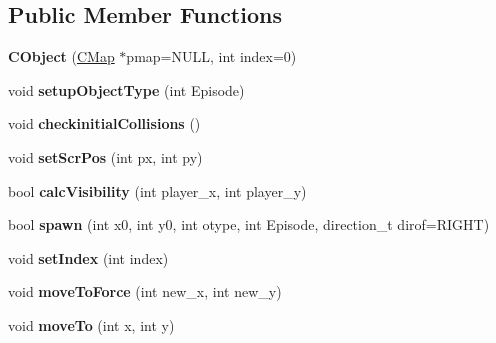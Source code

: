 \subsection*{Public Member Functions}
\begin{DoxyCompactItemize}
\item 
\hypertarget{class_c_object_a15f0090059dd92fa00912c9ac8892e9d}{
{\bfseries CObject} (\hyperlink{class_c_map}{CMap} $\ast$pmap=NULL, int index=0)}
\label{class_c_object_a15f0090059dd92fa00912c9ac8892e9d}

\item 
\hypertarget{class_c_object_a10eb6357b1f315b1a0c5977a236e40ba}{
void {\bfseries setupObjectType} (int Episode)}
\label{class_c_object_a10eb6357b1f315b1a0c5977a236e40ba}

\item 
\hypertarget{class_c_object_a2a6253d87797af86a998b154cca26f61}{
void {\bfseries checkinitialCollisions} ()}
\label{class_c_object_a2a6253d87797af86a998b154cca26f61}

\item 
\hypertarget{class_c_object_a6bd60b74aaf22bc4edb3d1c6f8f0cb83}{
void {\bfseries setScrPos} (int px, int py)}
\label{class_c_object_a6bd60b74aaf22bc4edb3d1c6f8f0cb83}

\item 
\hypertarget{class_c_object_a0f21eb205cafa8da9d5c5e31f5687835}{
bool {\bfseries calcVisibility} (int player\_\-x, int player\_\-y)}
\label{class_c_object_a0f21eb205cafa8da9d5c5e31f5687835}

\item 
\hypertarget{class_c_object_af308a9aa2dea8af7dbd91e67522902eb}{
bool {\bfseries spawn} (int x0, int y0, int otype, int Episode, direction\_\-t dirof=RIGHT)}
\label{class_c_object_af308a9aa2dea8af7dbd91e67522902eb}

\item 
\hypertarget{class_c_object_abdcf59fded95298dd7f26d305041f22c}{
void {\bfseries setIndex} (int index)}
\label{class_c_object_abdcf59fded95298dd7f26d305041f22c}

\item 
\hypertarget{class_c_object_ab8de9b925dc8fcee77acff072b179025}{
void {\bfseries moveToForce} (int new\_\-x, int new\_\-y)}
\label{class_c_object_ab8de9b925dc8fcee77acff072b179025}

\item 
\hypertarget{class_c_object_af0ccb726d662fa48961414cd033d0ab9}{
void {\bfseries moveTo} (int x, int y)}
\label{class_c_object_af0ccb726d662fa48961414cd033d0ab9}


\end{DoxyCompactItemize}
